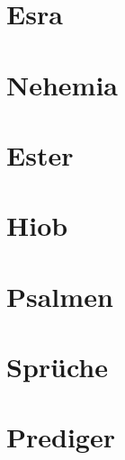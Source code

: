 \chapter{Esra}
\begin{multicols}{2}
  \raggedcolumns
  \parskip=0pt \relax
  
\end{multicols}

\chapter{Nehemia}
\begin{multicols}{2}
  \raggedcolumns
  \parskip=0pt \relax
  
\end{multicols}

\chapter{Ester}
\begin{multicols}{2}
  \raggedcolumns
  \parskip=0pt \relax
  
\end{multicols}

\chapter{Hiob}
\begin{multicols}{2}
  \raggedcolumns
  \parskip=0pt \relax
  
\end{multicols}

\chapter{Psalmen}
\begin{multicols}{2}
  \raggedcolumns
  \parskip=0pt \relax
  
\end{multicols}

\chapter{Sprüche}
\begin{multicols}{2}
  \raggedcolumns
  \parskip=0pt \relax
  
\end{multicols}

\chapter{Prediger}
\begin{multicols}{2}
  \raggedcolumns
  \parskip=0pt \relax
  
\end{multicols}

